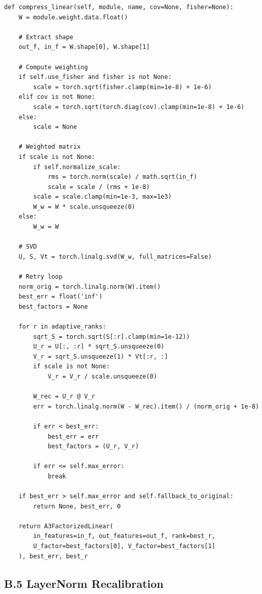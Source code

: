 \begin{lstlisting}
def compress_linear(self, module, name, cov=None, fisher=None):
    W = module.weight.data.float()
    
    # Extract shape
    out_f, in_f = W.shape[0], W.shape[1]
    
    # Compute weighting
    if self.use_fisher and fisher is not None:
        scale = torch.sqrt(fisher.clamp(min=1e-8) + 1e-6)
    elif cov is not None:
        scale = torch.sqrt(torch.diag(cov).clamp(min=1e-8) + 1e-6)
    else:
        scale = None
    
    # Weighted matrix
    if scale is not None:
        if self.normalize_scale:
            rms = torch.norm(scale) / math.sqrt(in_f)
            scale = scale / (rms + 1e-8)
        scale = scale.clamp(min=1e-3, max=1e3)
        W_w = W * scale.unsqueeze(0)
    else:
        W_w = W
    
    # SVD
    U, S, Vt = torch.linalg.svd(W_w, full_matrices=False)
    
    # Retry loop
    norm_orig = torch.linalg.norm(W).item()
    best_err = float('inf')
    best_factors = None
    
    for r in adaptive_ranks:
        sqrt_S = torch.sqrt(S[:r].clamp(min=1e-12))
        U_r = U[:, :r] * sqrt_S.unsqueeze(0)
        V_r = sqrt_S.unsqueeze(1) * Vt[:r, :]
        if scale is not None:
            V_r = V_r / scale.unsqueeze(0)
        
        W_rec = U_r @ V_r
        err = torch.linalg.norm(W - W_rec).item() / (norm_orig + 1e-8)
        
        if err < best_err:
            best_err = err
            best_factors = (U_r, V_r)
        
        if err <= self.max_error:
            break
    
    if best_err > self.max_error and self.fallback_to_original:
        return None, best_err, 0
    
    return A3FactorizedLinear(
        in_features=in_f, out_features=out_f, rank=best_r,
        U_factor=best_factors[0], V_factor=best_factors[1]
    ), best_err, best_r
\end{lstlisting}

\subsection{B.5 LayerNorm Recalibration}

